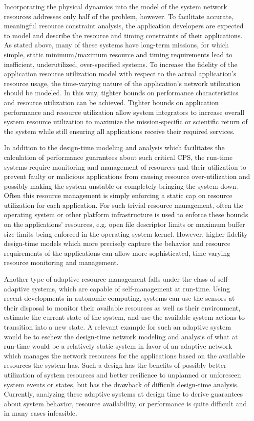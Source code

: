 Incorporating the physical dynamics into the model of the system
network resources addresses only half of the problem, however.  To
facilitate accurate, meaningful resource constraint analysis, the
application developers are expected to model and describe the resource
and timing constraints of their applications.  As stated above, many
of these systems have long-term missions, for which simple, static
minimum/maximum resource and timing requirements lead to inefficient,
underutilized, over-specified systems.  To increase the fidelity of
the application resource utilization model with respect to the actual
application's resource usage, the time-varying nature of the
application's network utilization should be modeled.  In this way,
tighter bounds on performance characteristics and resource utilization
can be achieved.  Tighter bounds on application performance and
resource utilization allow system integrators to increase overall
system resource utilization to maximize the mission-specific or
scientific return of the system while still ensuring all applications
receive their required services.

In addition to the design-time modeling and analysis which facilitates
the calculation of performance guarantees about such critical CPS, the
run-time systems require monitoring and management of resources and
their utilization to prevent faulty or malicious applications from
causing resource over-utilization and possibly making the system
unstable or completely bringing the system down.  Often this resource
management is simply enforcing a static cap on resource utilization
for each application.  For such trivial resource management, often the
operating system or other platform infrastructure is used to enforce
these bounds on the applications' resources, e.g. open file descriptor
limits or maximum buffer size limits being enforced in the operating
system kernel.  However, higher fidelity design-time models which more
precisely capture the behavior and resource requirements of the
applications can allow more sophisticated, time-varying resource
monitoring and management.

Another type of adaptive resource management falls under the class of
self-adaptive systems, which are capable of self-management at
run-time.  Using recent developments in autonomic computing, systems
can use the sensors at their disposal to monitor their available
resources as well as their environment, estimate the current state of
the system, and use the available system actions to transition into a
new state\cite{ibmAutonomicComputing2003}.  A relevant example for
such an adaptive system would be to eschew the design-time network
modeling and analysis of what at run-time would be a relatively static
system in favor of an adaptive network which manages the network
resources for the applications based on the available resources the
system has.  Such a design has the benefits of possibly better
utilization of system resources and better resilience to unplanned or
unforeseen system events or states, but has the drawback of difficult
design-time analysis.  Currently, analyzing these adaptive systems at
design time to derive guarantees about system behavior, resource
availability, or performance is quite difficult and in many cases
infeasible.


